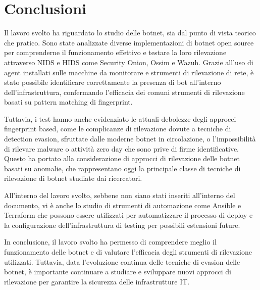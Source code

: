 \chapter{Conclusioni}





Il lavoro svolto ha riguardato lo studio delle botnet, sia dal punto di vista teorico che pratico. Sono state analizzate diverse implementazioni di botnet open source per comprenderne il funzionamento effettivo e testare la loro rilevazione attraverso NIDS e HIDS come Security Onion, Ossim e Wazuh. Grazie all'uso di agent installati sulle macchine da monitorare e strumenti di rilevazione di rete, è stato possibile identificare correttamente la presenza di bot all'interno dell'infrastruttura, confermando l'efficacia dei comuni strumenti di rilevazione basati su pattern matching di fingerprint.

Tuttavia, i test hanno anche evidenziato le attuali debolezze degli approcci fingerprint based, come le complicanze di rilevazione dovute a tecniche di detection evasion, sfruttate dalle moderne botnet in circolazione, o l'impossibilità di rilevare malware o attività zero day che sono prive di firme identificative. Questo ha portato alla considerazione di approcci di rilevazione delle botnet basati su anomalie, che rappresentano oggi la principale classe di tecniche di rilevazione di botnet studiate dai ricercatori.

All'interno del lavoro svolto, sebbene non siano stati inseriti all'interno del documento, vi è anche lo studio di strumenti di automazione come Ansible \cite{ansible} e Terraform \cite{terraform} che possono essere utilizzati per automatizzare il processo di deploy  e la configurazione dell'infrastruttura di testing per possibili estensioni future.

In conclusione, il lavoro svolto ha permesso di comprendere meglio il funzionamento delle botnet e di valutare l'efficacia degli strumenti di rilevazione utilizzati. Tuttavia, data l'evoluzione continua delle tecniche di evasion delle botnet, è importante continuare a studiare e sviluppare nuovi approcci di rilevazione per garantire la sicurezza delle infrastrutture IT.